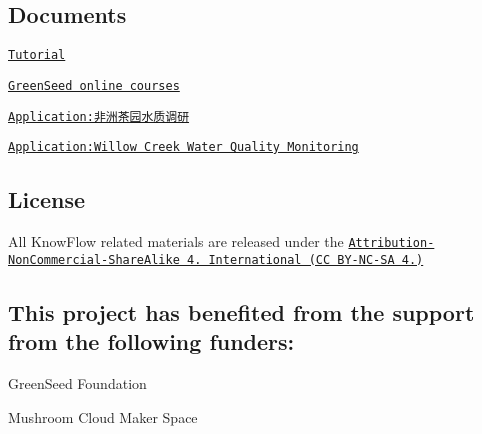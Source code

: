 \subsection*{Documents}


\begin{DoxyItemize}
\item \href{https://publiclab.org/notes/shanlter/06-08-2017/knowflow-automatic-water-meter}{\tt Tutorial}
\item \href{http://blog.sina.com.cn/s/blog_9f86b6d50102w9m1.html}{\tt Green\+Seed online courses}
\item \href{http://www.dfrobot.com.cn/community/thread-26733-1-1.html}{\tt Application\+:非洲茶园水质调研}
\item \href{https://publiclab.org/notes/MadTinker/07-31-2017/willow-creek-water-quality-monitoring}{\tt Application\+:Willow Creek Water Quality Monitoring}
\end{DoxyItemize}

\subsection*{License}

All Know\+Flow related materials are released under the \href{https://creativecommons.org/licenses/by-nc-sa/4.0/}{\tt Attribution-\/\+Non\+Commercial-\/\+Share\+Alike 4. International (CC B\+Y-\/\+N\+C-\/\+SA 4.)}

\subsection*{This project has benefited from the support from the following funders\+:}


\begin{DoxyItemize}
\item Green\+Seed Foundation
\item Mushroom Cloud Maker Space 
\end{DoxyItemize}
